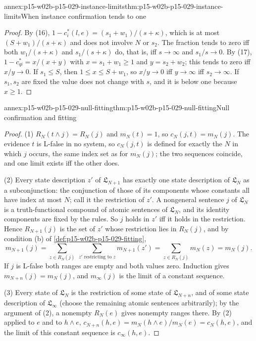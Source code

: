 \begin{annexitem}{annex:p15-w02b-p15-029-instance-limits}{thm:p15-w02b-p15-029-instance-limits}{When instance confirmation tends to one}
\begin{proof}
By (16), \(1-c^*_i(l,e)=(s_1+w_1)/(s+\kappa)\), which is at most
\((S+w_1)/(s+\kappa)\) and does not involve \(N\) or \(s_2\). The
fraction tends to zero iff both \(w_1/(s+\kappa)\) and
\(s_1/(s+\kappa)\) do, that is, iff \(s\to\infty\) and
\(s_1/s\to0\). By (17), \(1-c^*_{qi}=x/(x+y)\) with
\(x=s_1+w_1\geq1\) and \(y=s_2+w_2\); this tends to zero iff
\(x/y\to0\). If \(s_1\leq S\), then \(1\leq x\leq S+w_1\), so
\(x/y\to0\) iff \(y\to\infty\) iff \(s_2\to\infty\). If \(s_1,s_2\)
are fixed the value does not change with \(s\), and it is below one
because \(x\geq1\).
\end{proof}
\end{annexitem}

\begin{annexitem}{annex:p15-w02b-p15-029-null-fitting}{thm:p15-w02b-p15-029-null-fitting}{Null confirmation and fitting}
\begin{proof}
(1) \(R_N(t\land j)=R_N(j)\) and \(m_N(t)=1\), so
\(c_N(j,t)=m_N(j)\). The evidence \(t\) is L-false in no system, so
\(c_N(j,t)\) is defined for exactly the \(N\) in which \(j\) occurs,
the same index set as for \(m_N(j)\); the two sequences coincide, and
one limit exists iff the other does.

(2) Every state description \(z'\) of \(\mathfrak L_{N+1}\) has exactly
one state description of \(\mathfrak L_N\) as a subconjunction: the
conjunction of those of its components whose constants all have index at
most \(N\); call it the restriction of \(z'\). A nongeneral sentence
\(j\) of \(\mathfrak L_N\) is a truth-functional compound of atomic
sentences of \(\mathfrak L_N\), and its identity components are fixed
by the rules. So \(j\) holds in \(z'\) iff it holds in the restriction.
Hence \(R_{N+1}(j)\) is the set of \(z'\) whose restriction lies in
\(R_N(j)\), and by condition (b) of
\cref{def:p15-w02b-p15-029-fitting},
\[
 m_{N+1}(j)=\sum_{z\in R_N(j)}\ \sum_{z'\text{ restricting to }z}m_{N+1}(z')
 =\sum_{z\in R_N(j)}m_N(z)=m_N(j).
\]
If \(j\) is L-false both ranges are empty and both values zero.
Induction gives \(m_{N+n}(j)=m_N(j)\), and \(m_\infty(j)\) is the
limit of a constant sequence.

(3) Every state of \(\mathfrak L_N\) is the restriction of some state of
\(\mathfrak L_{N+n}\), and of some state description of
\(\mathfrak L_\infty\) (choose the remaining atomic sentences
arbitrarily); by the argument of (2), a nonempty \(R_N(e)\) gives
nonempty ranges there. By (2) applied to \(e\) and to \(h\land e\),
\(c_{N+n}(h,e)=m_N(h\land e)/m_N(e)=c_N(h,e)\), and the limit of this
constant sequence is \(c_\infty(h,e)\).
\end{proof}
\end{annexitem}

